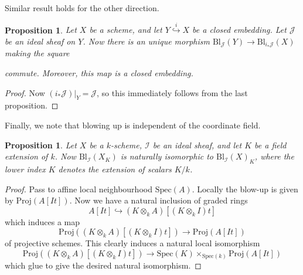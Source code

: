 \documentclass[12pt,a4paper,leqno]{article}
\newcommand{\spec}{\mathrm{Spec}}
\newcommand{\bl}{\mathrm{Bl}}
\newcommand{\proj}{\mathrm{Proj}}
\theoremstyle{plain}
\newtheorem{prop}[theo]{Proposition}
\theoremstyle{definition}
\theoremstyle{remark}
\begin{document}
Similar result holds for the other direction.

\begin{prop}
Let $X$ be a scheme, and let $Y \stackrel{i}{\hookrightarrow} X$ be a closed embedding. Let $\mathscr{J}$ be an ideal sheaf on $Y$. Now there is an unique morphism $\bl_{\mathscr{J}}(Y) \to \bl_{i_*\mathscr{J}}(X)$ making the square
\begin{center}
\end{center}
commute. Moreover, this map is a closed embedding.
\end{prop}
\begin{proof}
Now $(i_*\mathscr{J})|_Y = \mathscr{J}$, so this immediately follows from the last proposition.
\end{proof}

Finally, we note that blowing up is independent of the coordinate field.

\begin{prop}
Let $X$ be a $k$-scheme, $\mathscr{I}$ be an ideal sheaf, and let $K$ be a field extension of $k$. Now $\bl_{\mathscr{I}} (X_K)$ is naturally isomorphic to $\bl_{\mathscr{I}} (X)_K$, where the lower index $K$ denotes the extension of scalars $K / k$.
\end{prop}
\begin{proof}
Pass to affine local neighbourhood $\spec (A)$. Locally the blow-up is given by $\proj (A[It])$. Now we have a natural inclusion of graded rings
\begin{equation*}
A [I t] \hookrightarrow (K \otimes_k A) [(K \otimes_k I) t]
\end{equation*}
which induces a map
\begin{equation*}
\proj ((K \otimes_k A) [(K \otimes_k I) t]) \to \proj (A [I t])
\end{equation*} 
of projective schemes. This clearly induces a natural local isomorphism
\begin{equation*}
\proj ((K \otimes_k A) [(K \otimes_k I) t]) \to \spec (K)  \times_{\spec (k)} \proj (A [I t])
\end{equation*}
which glue to give the desired natural isomorphism.
\end{proof}
\end{document}
